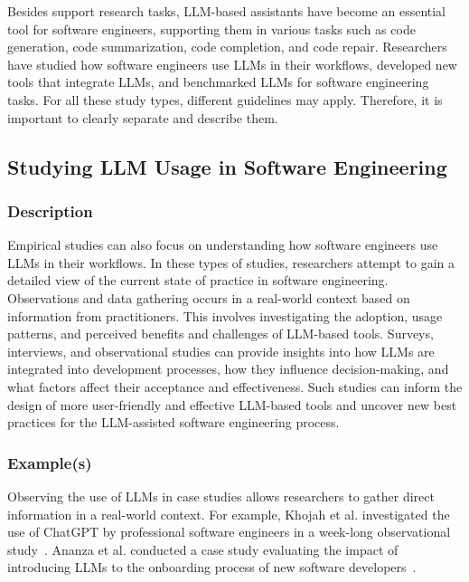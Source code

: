 Besides support research tasks, LLM-based assistants have become an essential tool for software engineers, supporting them in various tasks such as code generation, code summarization, code completion, and code repair.
Researchers have studied how software engineers use LLMs in their workflows, developed new tools that integrate LLMs, and benchmarked LLMs for software engineering tasks.
For all these study types, different guidelines may apply.
Therefore, it is important to clearly separate and describe them. 

\subsection{Studying LLM Usage in Software Engineering}

\subsubsection{Description}

Empirical studies can also focus on understanding how software engineers use LLMs in their workflows.
In these types of studies, researchers attempt to gain a detailed view of the current state of practice in software engineering.
Observations and data gathering occurs in a real-world context based on information from practitioners.
This involves investigating the adoption, usage patterns, and perceived benefits and challenges of LLM-based tools. 
Surveys, interviews, and observational studies can provide insights into how LLMs are integrated into development processes, how they influence decision-making, and what factors affect their acceptance and effectiveness. 
Such studies can inform the design of more user-friendly and effective LLM-based tools and uncover new best practices for the LLM-assisted software engineering process.

\subsubsection{Example(s)}

Observing the use of LLMs in case studies allows researchers to gather direct information in a real-world context.
For example, Khojah et al. investigated the use of ChatGPT by professional software engineers in a week-long observational study~\cite{DBLP:journals/pacmse/KhojahM0N24}.
Ananza et al. conducted a case study evaluating the impact of introducing LLMs to the onboarding process of new software developers~\cite{DBLP:conf/csee/AzanzaPIG24}.

